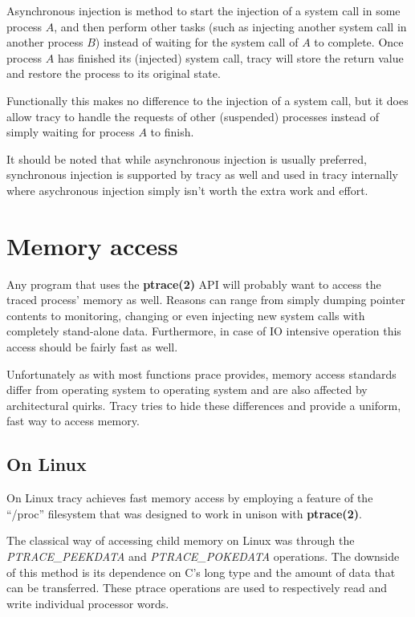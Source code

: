 \documentclass[a4paper, 10pt]{report}
\begin{document}
Asynchronous injection is method to start the injection of a system call in
some process $A$, and then perform other tasks (such as injecting another
system call in another process $B$) instead of waiting for the system call
of $A$ to complete.
Once process $A$ has finished its (injected) system call, tracy will store
the return value and restore the process to its original state.

Functionally this makes no difference to the injection of a system call, but
it does allow tracy to handle the requests of other (suspended) processes
instead of simply waiting for process $A$ to finish.

It should be noted that while asynchronous injection is usually preferred,
synchronous injection is supported by tracy as well and used in tracy
internally where asychronous injection simply isn't worth the extra work
and effort.

\section{Memory access}


Any program that uses the \textbf{ptrace(2)} API will probably want to access the
traced process' memory as well. Reasons can range from simply dumping pointer
contents to monitoring, changing or even injecting new system calls with
completely stand-alone data. Furthermore, in case of IO intensive operation
this access should be fairly fast as well.

Unfortunately as with most functions prace provides, memory access standards
differ from operating system to operating system and are also
affected by architectural quirks. Tracy tries to hide these differences and
provide a uniform, fast way to access memory.

\subsection{On Linux}
On Linux tracy achieves fast memory access by employing a feature of the
``/proc'' filesystem that was designed to work in unison with
\textbf{ptrace(2)}.

The classical way of accessing child memory on Linux was through the
\textit{PTRACE\_PEEKDATA} and \textit{PTRACE\_POKEDATA} operations.
The downside of this method is its dependence on C's long type and the
amount of data that can be transferred.
These ptrace operations are used to respectively read and write individual
processor words.
\end{document}
